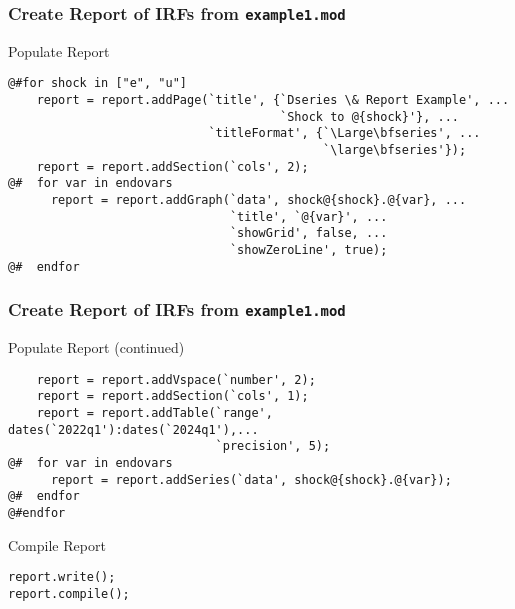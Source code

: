 \documentclass[10pt]{beamer}
\begin{document}
\begin{frame}[fragile=singleslide]
  \frametitle{Create Report of IRFs from \texttt{example1.mod}}
  \begin{block}{Populate Report}
\small{
\begin{verbatim}
@#for shock in ["e", "u"]
    report = report.addPage(`title', {`Dseries \& Report Example', ...
                                      `Shock to @{shock}'}, ...
                            `titleFormat', {`\Large\bfseries', ...
                                            `\large\bfseries'});
    report = report.addSection(`cols', 2);
@#  for var in endovars
      report = report.addGraph(`data', shock@{shock}.@{var}, ...
                               `title', `@{var}', ...
                               `showGrid', false, ...
                               `showZeroLine', true);
@#  endfor
\end{verbatim}
}
  \end{block}
\end{frame}


\begin{frame}[fragile=singleslide]
  \frametitle{Create Report of IRFs from \texttt{example1.mod}}
  \begin{block}{Populate Report (continued)}
\small{
\begin{verbatim}
    report = report.addVspace(`number', 2);
    report = report.addSection(`cols', 1);
    report = report.addTable(`range', dates(`2022q1'):dates(`2024q1'),...
                             `precision', 5);
@#  for var in endovars
      report = report.addSeries(`data', shock@{shock}.@{var});
@#  endfor
@#endfor
\end{verbatim}
}
  \end{block}

  \begin{block}{Compile Report}
\small{
\begin{verbatim}
report.write();
report.compile();
\end{verbatim}
}
  \end{block}
\end{frame}
\end{document}
